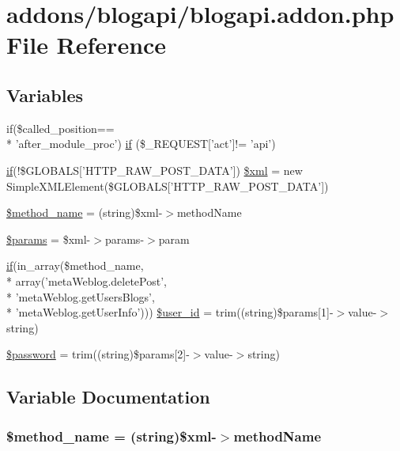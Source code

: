 \hypertarget{blogapi_8addon_8php}{\section{addons/blogapi/blogapi.addon.\+php File Reference}
\label{blogapi_8addon_8php}
}
\subsection*{Variables}
\begin{DoxyCompactItemize}
\item 
if(\$called\+\_\+position== \\*
'after\+\_\+module\+\_\+proc') \hyperlink{blogapi_8addon_8php_ae00067f6d78515f89a86a2a7f42cdc80}{if} (\$\+\_\+\+R\+E\+Q\+U\+E\+S\+T\mbox{[}'act'\mbox{]}!= 'api')
\item 
\hyperlink{point__level__icon_8addon_8php_a29031816e50a8f742422e671b2bef9b2}{if}(!\$G\+L\+O\+B\+A\+L\+S\mbox{[}'H\+T\+T\+P\+\_\+\+R\+A\+W\+\_\+\+P\+O\+S\+T\+\_\+\+D\+A\+T\+A'\mbox{]}) \hyperlink{blogapi_8addon_8php_a14ad998c59a6fcbcc09adbc67c7abb85}{\$xml} = new Simple\+X\+M\+L\+Element(\$G\+L\+O\+B\+A\+L\+S\mbox{[}'H\+T\+T\+P\+\_\+\+R\+A\+W\+\_\+\+P\+O\+S\+T\+\_\+\+D\+A\+T\+A'\mbox{]})
\item 
\hyperlink{blogapi_8addon_8php_a88c34f4701e451bbcef63e44e5902ebd}{\$method\+\_\+name} = (string)\$xml-\/$>$method\+Name
\item 
\hyperlink{blogapi_8addon_8php_afe68e6fbe7acfbffc0af0c84a1996466}{\$params} = \$xml-\/$>$params-\/$>$param
\item 
\hyperlink{point__level__icon_8addon_8php_a29031816e50a8f742422e671b2bef9b2}{if}(in\+\_\+array(\$method\+\_\+name, \\*
array('meta\+Weblog.\+delete\+Post', \\*
'meta\+Weblog.\+get\+Users\+Blogs', \\*
'meta\+Weblog.\+get\+User\+Info'))) \hyperlink{blogapi_8addon_8php_a6d0a036129b3030ce289a026c5e1eff2}{\$user\+\_\+id} = trim((string)\$params\mbox{[}1\mbox{]}-\/$>$value-\/$>$string)
\item 
\hyperlink{blogapi_8addon_8php_a607686ef9f99ea7c42f4f3dd3dbb2b0d}{\$password} = trim((string)\$params\mbox{[}2\mbox{]}-\/$>$value-\/$>$string)
\end{DoxyCompactItemize}


\subsection{Variable Documentation}
\hypertarget{blogapi_8addon_8php_a88c34f4701e451bbcef63e44e5902ebd}{
\subsubsection[{\$method\+\_\+name}]{\setlength{\rightskip}{0pt plus 5cm}\$method\+\_\+name = (string)\$xml-\/$>$method\+Name}}\label{blogapi_8addon_8php_a88c34f4701e451bbcef63e44e5902ebd}


